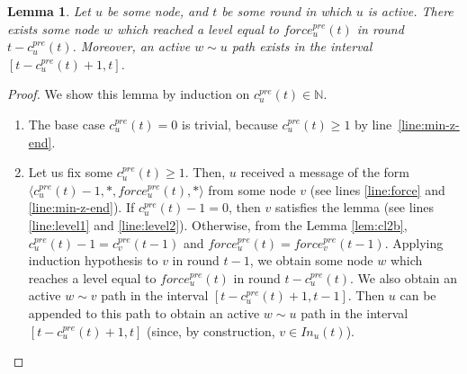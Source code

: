 \documentclass[11pt,letterpaper]{article}
\newtheorem{lem}[thm]{Lemma}
\begin{document}
\begin{lem} \label{lem:safety-force}
	Let $u$ be some node, and $t$ be some round in which $u$ is active.
	There exists some node $w$ which reached a level equal to $force_u^{pre}(t)$ in round $t-c_u^{pre}(t)$.
	Moreover, an active $w \sim u$ path exists in the interval $[t-c_u^{pre}(t)+1,t]$.
\end{lem}
\begin{proof}
	We show this lemma by induction on $c_u^{pre}(t) \in \mathds{N}$.
	\begin{enumerate}
		\item The base case $c_u^{pre}(t) = 0$ is trivial, because $c_u^{pre}(t) \geq 1$ by line~\ref{line:min-z-end}.
		\item Let us fix some $c_u^{pre}(t) \geq 1$.
			Then, $u$ received a message of the form $\langle c_u^{pre}(t)-1, *, force_u^{pre}(t), * \rangle$ from some node $v$ (see lines \ref{line:force} and \ref{line:min-z-end}).
			If $c_u^{pre}(t) - 1 = 0$, then $v$ satisfies the lemma (see lines \ref{line:level1} and \ref{line:level2}).
			Otherwise, from the Lemma \ref{lem:cl2b}, $c_u^{pre}(t)-1 = c_v^{pre}(t-1)$ and $force_u^{pre}(t) = force_v^{pre}(t-1)$.
			Applying induction hypothesis to $v$ in round $t-1$, we obtain some node $w$ which reaches a level equal to $force_u^{pre}(t)$ in round $t-c_u^{pre}(t)$.
			We also obtain an active $w \sim v$ path in the interval $[t-c_u^{pre}(t)+1,t-1]$.
			Then $u$ can be appended to this path to obtain an active $w \sim u$ path in the interval $[t-c_u^{pre}(t)+1,t]$ (since, by construction, $v \in In_u(t)$).
	\end{enumerate}
\end{proof}
\end{document}
